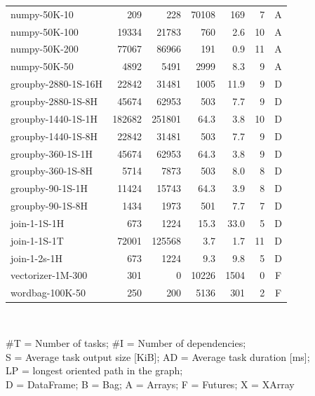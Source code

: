 \begin{table}
\begin{tabular}{l|rrrrrc}
		numpy-50K-10        & 209          & 228                & 70108      & 169   & 7  & A \\
		numpy-50K-100       & 19334        & 21783              & 760        & 2.6   & 10 & A \\
		numpy-50K-200       & 77067        & 86966              & 191        & 0.9   & 11 & A \\
		numpy-50K-50        & 4892         & 5491               & 2999       & 8.3   & 9  & A \\
		groupby-2880-1S-16H & 22842        & 31481              & 1005       & 11.9  & 9  & D \\
		groupby-2880-1S-8H  & 45674        & 62953              & 503        & 7.7   & 9  & D \\
		groupby-1440-1S-1H  & 182682       & 251801             & 64.3       & 3.8   & 10 & D \\
		groupby-1440-1S-8H  & 22842        & 31481              & 503        & 7.7   & 9  & D \\
		groupby-360-1S-1H   & 45674        & 62953              & 64.3       & 3.8   & 9  & D \\
		groupby-360-1S-8H   & 5714         & 7873               & 503        & 8.0   & 8  & D \\
		groupby-90-1S-1H    & 11424        & 15743              & 64.3       & 3.9   & 8  & D \\
		groupby-90-1S-8H    & 1434         & 1973               & 501        & 7.7   & 7  & D \\
		join-1-1S-1H        & 673          & 1224               & 15.3       & 33.0  & 5  & D \\
		join-1-1S-1T        & 72001        & 125568             & 3.7        & 1.7   & 11 & D \\
		join-1-2s-1H        & 673          & 1224               & 9.3        & 9.8   & 5  & D \\
		vectorizer-1M-300   & 301          & 0                  & 10226      & 1504  & 0  & F \\
		wordbag-100K-50     & 250          & 200                & 5136       & 301   & 2  & F \\
		\bottomrule
	\end{tabular}\\
	\vspace{1mm}

	\#T = Number of tasks; \#I = Number of dependencies; \\
	S = Average task output size [KiB]; AD = Average task
	duration [ms]; \\ LP = longest oriented path in the graph; \\ D = DataFrame; B
	= Bag; A = Arrays; F = Futures; X = XArray
\end{table}

